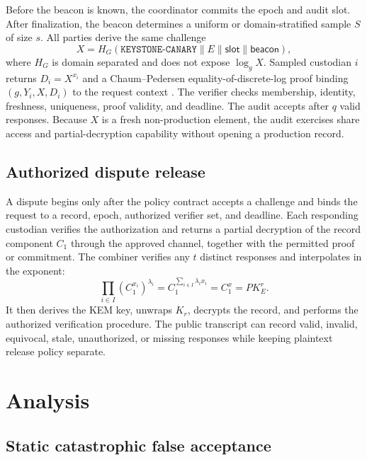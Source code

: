 \documentclass[10pt]{article}
\begin{document}
Before the beacon is known, the coordinator commits the epoch and audit slot. After finalization, the beacon determines a uniform or domain-stratified sample $S$ of size $s$. All parties derive the same challenge
\[
X=H_G(\texttt{KEYSTONE-CANARY}\parallel E\parallel \mathsf{slot}\parallel \mathsf{beacon}),
\]
where $H_G$ is domain separated and does not expose $\log_g X$. Sampled custodian $i$ returns $D_i=X^{x_i}$ and a Chaum--Pedersen equality-of-discrete-log proof binding $(g,Y_i,X,D_i)$ to the request context \citep{chaum1992dleq,rfc9380}. The verifier checks membership, identity, freshness, uniqueness, proof validity, and deadline. The audit accepts after $q$ valid responses. Because $X$ is a fresh non-production element, the audit exercises share access and partial-decryption capability without opening a production record.

\subsection{Authorized dispute release}

A dispute begins only after the policy contract accepts a challenge and binds the request to a record, epoch, authorized verifier set, and deadline. Each responding custodian verifies the authorization and returns a partial decryption of the record component $C_1$ through the approved channel, together with the permitted proof or commitment. The combiner verifies any $t$ distinct responses and interpolates in the exponent:
\[
\prod_{i\in I} (C_1^{x_i})^{\lambda_i}=C_1^{\sum_{i\in I}\lambda_i x_i}=C_1^x=PK_E^r.
\]
It then derives the KEM key, unwraps $K_r$, decrypts the record, and performs the authorized verification procedure. The public transcript can record valid, invalid, equivocal, stale, unauthorized, or missing responses while keeping plaintext release policy separate.

\section{Analysis}

\subsection{Static catastrophic false acceptance}
\end{document}

